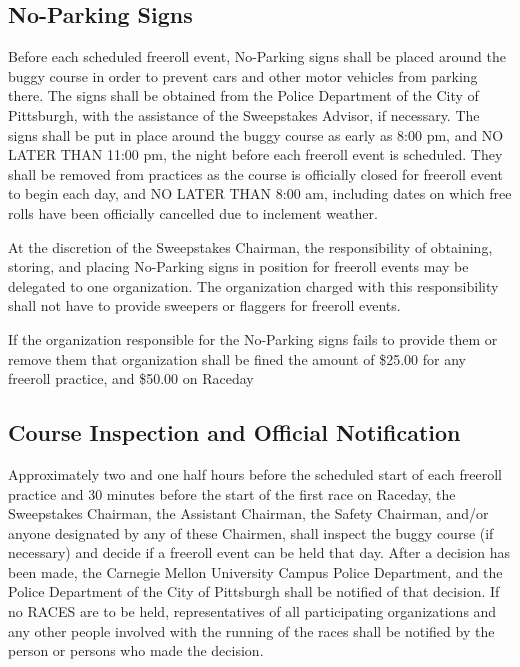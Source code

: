 	
\subsection{No-Parking Signs}

	Before each scheduled freeroll event, No-Parking signs shall be placed
	around the buggy course in order to prevent cars and other motor vehicles from
	parking there. The signs shall be obtained from the Police Department of the
	City of Pittsburgh, with the assistance of the Sweepstakes Advisor, if
	necessary. The signs shall be put in place around the buggy course as early as
	8:00 pm, and NO LATER THAN 11:00 pm, the night before each freeroll event is
	scheduled. They shall be removed from practices as the course is officially closed for
	freeroll event to begin each day, and NO LATER THAN 8:00 am, including dates
	on which free rolls have been officially cancelled due to inclement weather.

	At the discretion of the Sweepstakes Chairman, the responsibility of obtaining,
	storing, and placing No-Parking signs in position for freeroll events may be
	delegated to one organization. The organization charged with this
	responsibility shall not have to provide sweepers or flaggers for freeroll
	events.

	If the organization responsible for the No-Parking signs fails to provide them
	or remove them that organization shall be fined the
	amount of \$25.00 for any freeroll practice, and \$50.00 on Raceday

	
\subsection{Course Inspection and Official Notification}

	Approximately two and one half hours before the scheduled start of each
	freeroll practice and 30 minutes before the start of the first race on Raceday,
	the Sweepstakes Chairman, the Assistant Chairman, the Safety
	Chairman, and/or anyone designated by any of these Chairmen, shall inspect the
	buggy course (if necessary) and decide if a freeroll event can be held that
	day. After a decision has been made, the Carnegie Mellon University Campus
	Police Department, and the Police Department of the City of Pittsburgh shall be
	notified of that decision. If no RACES are to be held,
	representatives of all participating organizations and any other people
	involved with the running of the races shall be notified by the person or
	persons who made the decision.


